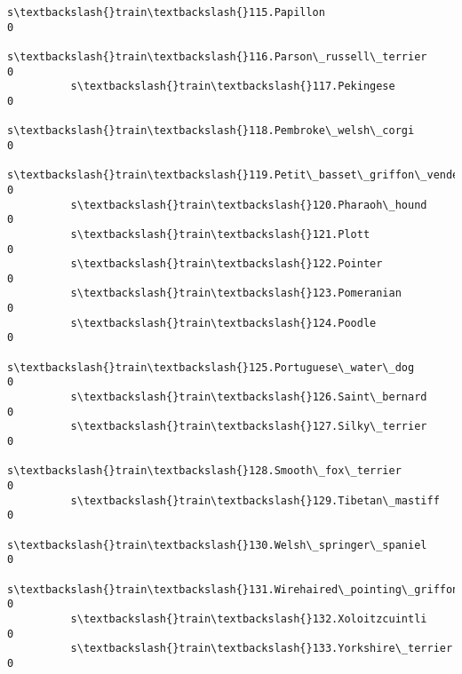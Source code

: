 \documentclass[11pt]{article}
\begin{document}
\begin{Verbatim}[commandchars=\\\{\}]
          s\textbackslash{}train\textbackslash{}115.Papillon                                                          0   
          s\textbackslash{}train\textbackslash{}116.Parson\_russell\_terrier                                            0   
          s\textbackslash{}train\textbackslash{}117.Pekingese                                                         0   
          s\textbackslash{}train\textbackslash{}118.Pembroke\_welsh\_corgi                                              0   
          s\textbackslash{}train\textbackslash{}119.Petit\_basset\_griffon\_vendeen                                      0   
          s\textbackslash{}train\textbackslash{}120.Pharaoh\_hound                                                     0   
          s\textbackslash{}train\textbackslash{}121.Plott                                                             0   
          s\textbackslash{}train\textbackslash{}122.Pointer                                                           0   
          s\textbackslash{}train\textbackslash{}123.Pomeranian                                                        0   
          s\textbackslash{}train\textbackslash{}124.Poodle                                                            0   
          s\textbackslash{}train\textbackslash{}125.Portuguese\_water\_dog                                              0   
          s\textbackslash{}train\textbackslash{}126.Saint\_bernard                                                     0   
          s\textbackslash{}train\textbackslash{}127.Silky\_terrier                                                     0   
          s\textbackslash{}train\textbackslash{}128.Smooth\_fox\_terrier                                                0   
          s\textbackslash{}train\textbackslash{}129.Tibetan\_mastiff                                                   0   
          s\textbackslash{}train\textbackslash{}130.Welsh\_springer\_spaniel                                            0   
          s\textbackslash{}train\textbackslash{}131.Wirehaired\_pointing\_griffon                                       0   
          s\textbackslash{}train\textbackslash{}132.Xoloitzcuintli                                                    0   
          s\textbackslash{}train\textbackslash{}133.Yorkshire\_terrier                                                 0   
          

\end{Verbatim}
\end{document}
